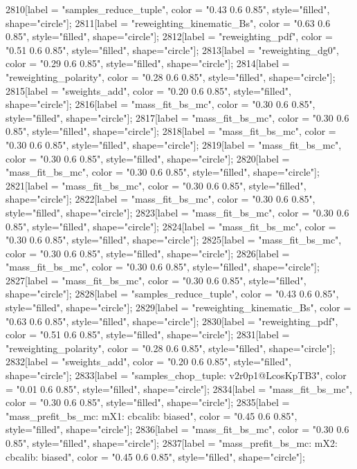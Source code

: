 {	2810[label = "samples_reduce_tuple", color = "0.43 0.6 0.85", style="filled", shape="circle"];
	2811[label = "reweighting_kinematic_Bs", color = "0.63 0.6 0.85", style="filled", shape="circle"];
	2812[label = "reweighting_pdf", color = "0.51 0.6 0.85", style="filled", shape="circle"];
	2813[label = "reweighting_dg0", color = "0.29 0.6 0.85", style="filled", shape="circle"];
	2814[label = "reweighting_polarity", color = "0.28 0.6 0.85", style="filled", shape="circle"];
	2815[label = "sweights_add", color = "0.20 0.6 0.85", style="filled", shape="circle"];
	2816[label = "mass_fit_bs_mc", color = "0.30 0.6 0.85", style="filled", shape="circle"];
	2817[label = "mass_fit_bs_mc", color = "0.30 0.6 0.85", style="filled", shape="circle"];
	2818[label = "mass_fit_bs_mc", color = "0.30 0.6 0.85", style="filled", shape="circle"];
	2819[label = "mass_fit_bs_mc", color = "0.30 0.6 0.85", style="filled", shape="circle"];
	2820[label = "mass_fit_bs_mc", color = "0.30 0.6 0.85", style="filled", shape="circle"];
	2821[label = "mass_fit_bs_mc", color = "0.30 0.6 0.85", style="filled", shape="circle"];
	2822[label = "mass_fit_bs_mc", color = "0.30 0.6 0.85", style="filled", shape="circle"];
	2823[label = "mass_fit_bs_mc", color = "0.30 0.6 0.85", style="filled", shape="circle"];
	2824[label = "mass_fit_bs_mc", color = "0.30 0.6 0.85", style="filled", shape="circle"];
	2825[label = "mass_fit_bs_mc", color = "0.30 0.6 0.85", style="filled", shape="circle"];
	2826[label = "mass_fit_bs_mc", color = "0.30 0.6 0.85", style="filled", shape="circle"];
	2827[label = "mass_fit_bs_mc", color = "0.30 0.6 0.85", style="filled", shape="circle"];
	2828[label = "samples_reduce_tuple", color = "0.43 0.6 0.85", style="filled", shape="circle"];
	2829[label = "reweighting_kinematic_Bs", color = "0.63 0.6 0.85", style="filled", shape="circle"];
	2830[label = "reweighting_pdf", color = "0.51 0.6 0.85", style="filled", shape="circle"];
	2831[label = "reweighting_polarity", color = "0.28 0.6 0.85", style="filled", shape="circle"];
	2832[label = "sweights_add", color = "0.20 0.6 0.85", style="filled", shape="circle"];
	2833[label = "samples_chop_tuple\nversion: v2r0p1@LcosKpTB3", color = "0.01 0.6 0.85", style="filled", shape="circle"];
	2834[label = "mass_fit_bs_mc", color = "0.30 0.6 0.85", style="filled", shape="circle"];
	2835[label = "mass_prefit_bs_mc\nmassbin: mX1\nmassmodel: cbcalib\ntrigger: biased", color = "0.45 0.6 0.85", style="filled", shape="circle"];
	2836[label = "mass_fit_bs_mc", color = "0.30 0.6 0.85", style="filled", shape="circle"];
	2837[label = "mass_prefit_bs_mc\nmassbin: mX2\nmassmodel: cbcalib\ntrigger: biased", color = "0.45 0.6 0.85", style="filled", shape="circle"];
}
